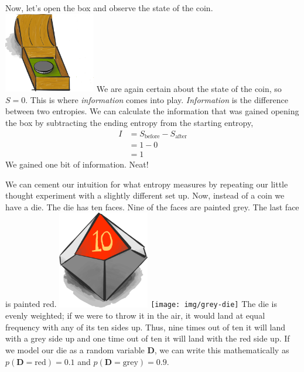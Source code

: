 Now, let's open the box and observe the state of the coin.
\includegraphics[width=0.3\textwidth]{img/big-box-open-coin}
We are again certain about the state of the coin, so $S = 0$.
This is where \textit{information} comes into play.
\textit{Information} is the difference between two entropies.
We can calculate the information that was gained opening the box by subtracting the ending entropy from the starting entropy,
\begin{align*}
I
&= S_{\text{before}} - S_{\text{after}} \\
&= 1 - 0 \\
&= 1
\end{align*}
We gained one bit of information.
Neat!

We can cement our intuition for what entropy measures by repeating our little thought experiment with a slightly different set up.
Now, instead of a coin we have a die.
The die has ten faces.
Nine of the faces are painted grey.
The last face is painted red.
\includegraphics[width=0.3\textwidth]{img/red-die}
\texttt{[image: img/grey-die]}
The die is evenly weighted;
if we were to throw it in the air, it would land at equal frequency with any of its ten sides up.
Thus, nine times out of ten it will land with a grey side up and one time out of ten it will land with the red side up.
If we model our die as a random variable $\bm{D}$, we can write this mathematically as $p(\bm{D} = \text{red}) = 0.1$ and $p(\bm{D} = \text{grey}) = 0.9$.


